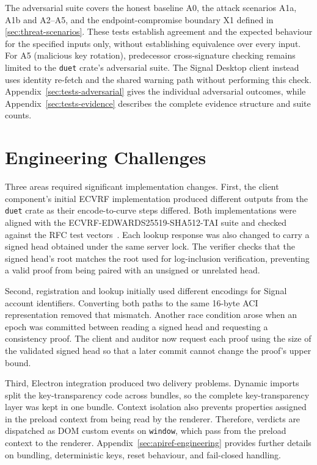 The adversarial suite covers the honest baseline A0, the attack scenarios A1a, A1b and A2--A5,
and the endpoint-compromise boundary X1 defined in \cref{sec:threat-scenarios}. These tests establish agreement
and the expected behaviour for the specified inputs only, without establishing equivalence over
every input. For A5 (malicious key rotation), predecessor cross-signature checking remains limited
to the \texttt{duet} crate's adversarial suite. The Signal Desktop client instead uses identity
re-fetch and the shared warning path without performing this check.
Appendix~\ref{sec:tests-adversarial} gives the individual adversarial outcomes, while
Appendix~\ref{sec:tests-evidence} describes the complete evidence structure and suite counts.

\FloatBarrier
\section{Engineering Challenges}\label{sec:impl-challenges}

Three areas required significant implementation changes. First, the client component's initial
ECVRF implementation produced different outputs from the \texttt{duet} crate as their
encode-to-curve steps differed. Both implementations were aligned with the
ECVRF-EDWARDS25519-SHA512-TAI suite and checked against the RFC test
vectors~\cite{rfc9381}. Each lookup response was also changed to carry a signed head
obtained under the same server lock. The verifier checks that the signed head's root matches the
root used for log-inclusion verification, preventing a valid proof from being paired with an
unsigned or unrelated head.

Second, registration and lookup initially used different encodings for Signal account identifiers.
Converting both paths to the same 16-byte ACI representation removed that mismatch. Another
race condition arose when an epoch was committed between reading a signed head and requesting a
consistency proof. The client and auditor now request each proof using the size of the validated
signed head so that a later commit cannot change the proof's upper bound.

Third, Electron integration produced two delivery problems. Dynamic imports split the
key-transparency code across bundles, so the complete key-transparency layer was kept in one bundle.
Context isolation also prevents properties assigned in the preload context from being read by the
renderer. Therefore, verdicts are dispatched as DOM custom events on \texttt{window}, which pass
from the preload context to the renderer.
Appendix~\ref{sec:apiref-engineering} provides further details on bundling, deterministic keys,
reset behaviour, and fail-closed handling.
